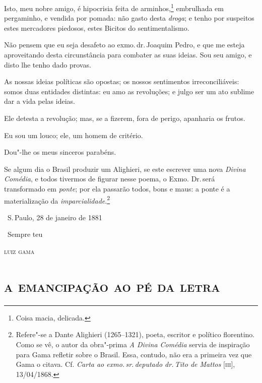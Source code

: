 Isto, meu nobre amigo, é hipocrisia feita de arminhos,\footnote{Coisa
  macia, delicada.} embrulhada em pergaminho, e vendida por pomada: não
gasto desta \emph{droga}; e tenho por suspeitos estes mercadores
piedosos, estes Bicitos do sentimentalismo.

Não pensem que eu seja desafeto ao exmo.\,dr.\,Joaquim Pedro, e que me
esteja aproveitando desta circunstância para combater as suas ideias.
Sou seu amigo, e disto lhe tenho dado provas.

As nossas ideias políticas são opostas; os nossos sentimentos
irreconciliáveis: somos duas entidades distintas: eu amo as revoluções;
e julgo ser um ato sublime dar a vida pelas ideias.

Ele detesta a revolução; mas, se a fizerem, fora de perigo, apanharia os
frutos.

Eu sou um louco; ele, um homem de critério.

Dou"-lhe os meus sinceros parabéns.

Se algum dia o Brasil produzir um Alighieri, se este escrever uma nova
\emph{Divina Comédia}, e todos tivermos de figurar nesse poema, o Exmo.
Dr.\,será transformado em \emph{ponte}; por ela passarão todos, bons e
maus: a ponte é a materialização da \emph{imparcialidade}.\footnote{
  Refere"-se a Dante Alighieri (1265--1321), poeta, escritor e político
  florentino. Como se vê, o autor da obra"-prima \emph{A Divina
  Comédia} servia de inspiração para Gama refletir sobre o Brasil.
  Essa, contudo, não era a primeira vez que Gama o citava. Cf.
  \emph{Carta ao exmo.\,sr.\,deputado dr.\,Tito de Mattos} {[}\textsc{iii}{]},
  13/04/1868.}

\bigskip

\hfill\ S.\,Paulo, 28 de janeiro de 1881\smallskip

\hfill\ Sempre teu

\hfill\textsc{luiz gama}

\begingroup\makeatletter\@openrightfalse
\part{\textsc{a emancipação ao pé da letra}}

\mbox{}\vfill
\thispagestyle{empty}

